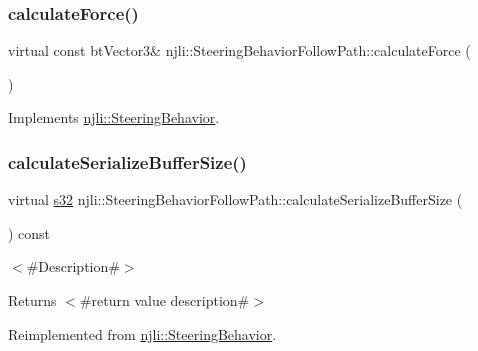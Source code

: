 \subsubsection{\texorpdfstring{calculate\+Force()}{calculateForce()}}
{\footnotesize\ttfamily virtual const bt\+Vector3\& njli\+::\+Steering\+Behavior\+Follow\+Path\+::calculate\+Force (\begin{DoxyParamCaption}{ }\end{DoxyParamCaption})\hspace{0.3cm}{\ttfamily [virtual]}}



Implements \mbox{\hyperlink{classnjli_1_1_steering_behavior_a9720953de1268f658636213946d76ed3}{njli\+::\+Steering\+Behavior}}.

\mbox{\label{classnjli_1_1_steering_behavior_follow_path_af60b873d59ffb7c5e800e2511f942978}} 
\subsubsection{\texorpdfstring{calculate\+Serialize\+Buffer\+Size()}{calculateSerializeBufferSize()}}
{\footnotesize\ttfamily virtual \mbox{\hyperlink{_util_8h_aa62c75d314a0d1f37f79c4b73b2292e2}{s32}} njli\+::\+Steering\+Behavior\+Follow\+Path\+::calculate\+Serialize\+Buffer\+Size (\begin{DoxyParamCaption}{ }\end{DoxyParamCaption}) const\hspace{0.3cm}{\ttfamily [virtual]}}

$<$\#\+Description\#$>$

\begin{DoxyReturn}{Returns}
$<$\#return value description\#$>$ 
\end{DoxyReturn}


Reimplemented from \mbox{\hyperlink{classnjli_1_1_steering_behavior_abbc461d853c1b225cfde5b79d96d11bd}{njli\+::\+Steering\+Behavior}}.

\mbox{\label{classnjli_1_1_steering_behavior_follow_path_afb1d08e0c6eba6d0096a0b021e58e0ed}} 
